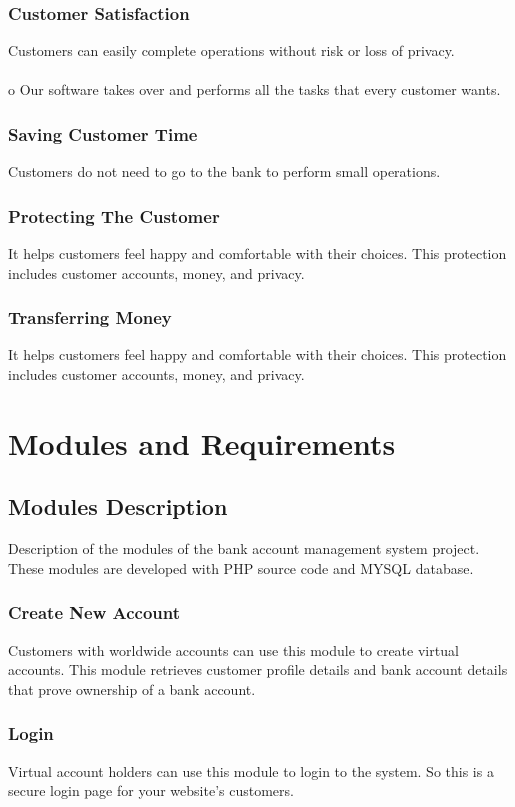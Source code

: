 \documentclass{article}
\begin{document}
\subsubsection{Customer Satisfaction}
Customers can easily complete operations without risk or loss of privacy. \\\\ o Our software takes over and performs all the tasks that every customer wants.
\subsubsection{Saving Customer Time}
Customers do not need to go to the bank to perform small operations.
\subsubsection{Protecting The Customer}
It helps customers feel happy and comfortable with their choices. This protection includes customer accounts, money, and privacy.
\subsubsection{Transferring Money}
It helps customers feel happy and comfortable with their choices. This protection includes customer accounts, money, and privacy.
\newpage
\section{Modules and Requirements }
\subsection{Modules Description}
Description of the modules of the bank account management system project. These modules are developed with PHP source code and MYSQL database.

\subsubsection{Create New Account}
Customers with worldwide accounts can use this module to create virtual accounts. This module retrieves customer profile details and bank account details that prove ownership of a bank account.
\subsubsection{Login}
Virtual account holders can use this module to login to the system. So this is a secure login page for your website's customers.
\newpage
\end{document}
